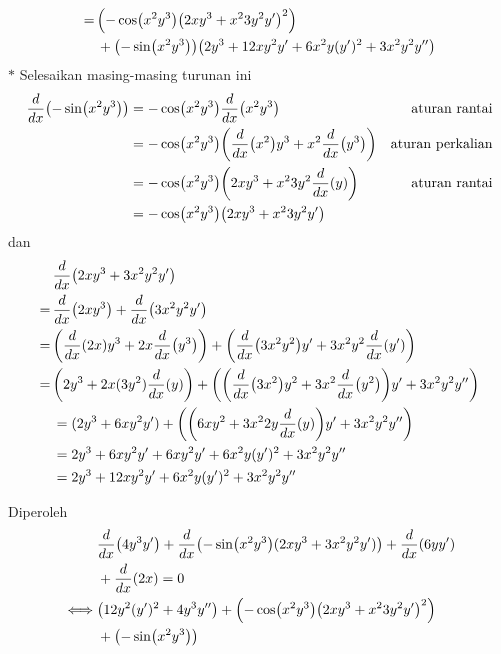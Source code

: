 \begin{enumerate}[leftmargin=*, label={\arabic*}.]
\begin{enumerate}[label={\alph*}.]
\begin{enumerate}[label={\arabic*})]
\begin{align*}
            =\,&\brk*{-\cos\brk*{x^{2}y^{3}}\brk*{2xy^{3}+x^{2}3y^{2}y'}^{2}}
            \\&+\brk*{-\sin\brk*{x^{2}y^{3}}}
            \brk*{2y^{3}+12xy^{2}y'+6x^{2}y(y')^{2}+3x^{2}y^{2}y''}
        \end{align*}
        $*$ Selesaikan masing-masing turunan ini
        \begin{align*}
            \drv{x}{-\sin\brk*{x^{2}y^{3}}}
            &=-\cos\brk*{x^{2}y^{3}}\drv{x}{x^{2}y^{3}}
            &\text{aturan rantai}\\
            &=-\cos\brk*{x^{2}y^{3}}
            \brk*{\drv{x}{x^{2}}y^{3}+x^{2}\drv{x}{y^{3}}}
            &\text{aturan perkalian}\\
            &=-\cos\brk*{x^{2}y^{3}}
            \brk*{2xy^{3}+x^{2}3y^{2}\drv{x}{y}}
            &\text{aturan rantai}\\
            &=-\cos\brk*{x^{2}y^{3}}
            \brk*{2xy^{3}+x^{2}3y^{2}y'}
        \end{align*}
        dan
        \begin{align*}
            &\drv{x}{2xy^{3}+3x^{2}y^{2}y'} \\
            =\,&\drv{x}{2xy^{3}}+\drv{x}{3x^{2}y^{2}y'}\\
            =\,&\brk*{\drv{x}{2x}y^{3}+2x\drv{x}{y^{3}}}
            +\brk*{\drv{x}{3x^{2}y^{2}}y'+3x^{2}y^{2}\drv{x}{y'}}\\
            =\,&\brk*{2y^{3}+2x(3y^2)\drv{x}{y}}
            +\brk*{\brk*{\drv{x}{3x^{2}}y^2+3x^{2}\drv{x}{y^2}}y'
            +3x^{2}y^{2}y''}\\
            &=(2y^{3}+6xy^{2}y')+\brk*{\brk*{6xy^{2}+3x^{2}2y\drv{x}{y}}y'
            +3x^{2}y^{2}y''}\\
            &=2y^{3}+6xy^{2}y'+6xy^{2}y'+6x^{2}y(y')^{2}+3x^{2}y^{2}y''\\
            &=2y^{3}+12xy^{2}y'+6x^{2}y(y')^{2}+3x^{2}y^{2}y''\\
        \end{align*}
        \end{enumerate}
    Diperoleh
    \begin{align*}
        &\drv{x}{4y^{3}y'}+\drv{x}{-\sin\brk*{x^{2}y^{3}}(2xy^{3}+3x^{2}y^{2}y')}
        +\drv{x}{6yy'}\\
        &+\drv{x}{2x}=0\\
        \iff &\brk*{12y^{2}(y')^{2}+4y^{3}y''}
        +\brk*{-\cos\brk*{x^{2}y^{3}}\brk*{2xy^{3}+x^{2}3y^{2}y'}^{2}}
        \\&+\brk*{-\sin\brk*{x^{2}y^{3}}}

\end{align*}
\end{enumerate}
\end{enumerate}
